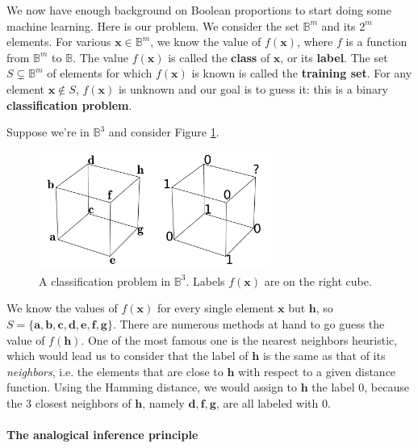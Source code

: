 We now have enough background on Boolean proportions to start doing some
machine learning. Here is our problem. We consider the set $\mathbb{B}^m$ and
its $2^m$ elements. For various $\mathbf{x} \in \mathbb{B}^m$, we know the
value of $f(\mathbf{x})$, where $f$ is a function from $\mathbb{B}^m$ to
$\mathbb{B}$.  The value $f(\mathbf{x})$ is called the \textbf{class} of
$\mathbf{x}$, or its \textbf{label}. The set $S \subsetneq \mathbb{B}^m$ of
elements for which $f(\mathbf{x})$ is known is called the \textbf{training
set}. For any element $\mathbf{x} \notin S$, $f(\mathbf{x})$ is unknown and our
goal is to guess it: this is a binary \textbf{classification problem}.

Suppose we're in $\mathbb{B}^3$ and consider Figure
\ref{FIG:classification_problem}.
\begin{figure}[!h]
\centering
  \includegraphics[width=3in]{figures/classification_problem.pdf}
  \caption{A classification problem in $\mathbb{B}^3$. Labels $f(\mathbf{x})$
  are on the right cube.}
\label{FIG:classification_problem}
\end{figure}
We know the values of $f(\mathbf{x})$ for
every single element $\mathbf{x}$ but $\mathbf{h}$, so $S = \{ \mathbf{a}, \mathbf{b},
\mathbf{c}, \mathbf{d}, \mathbf{e}, \mathbf{f}, \mathbf{g}\}$. There are
numerous methods at hand to go guess the value of $f(\mathbf{h})$. One of the
most famous one is the nearest neighbors heuristic, which would lead us to
consider that the label of $\mathbf{h}$ is the same as  that of its
\textit{neighbors}, i.e. the elements that are close to $\mathbf{h}$ with
respect to a given distance function. Using the Hamming distance, we would
assign to $\mathbf{h}$ the label $0$, because the $3$ closest neighbors of
$\mathbf{h}$, namely $\mathbf{d}, \mathbf{f}, \mathbf{g}$, are all labeled with
$0$.

\paragraph{The analogical inference principle\\}


